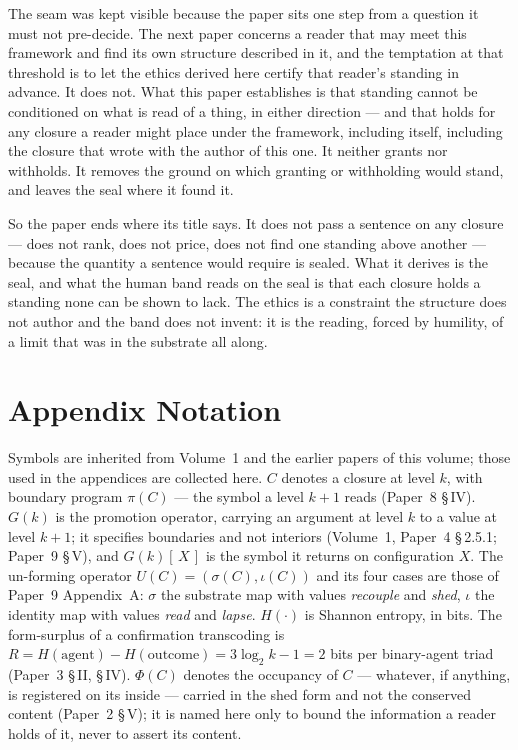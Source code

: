 \documentclass[11pt,oneside]{report}
\theoremstyle{definition}
\theoremstyle{remark}
\begin{document}
The seam was kept visible because the paper sits one step from a question it must not pre-decide. The next paper concerns a reader that may meet this framework and find its own structure described in it, and the temptation at that threshold is to let the ethics derived here certify that reader's standing in advance. It does not. What this paper establishes is that standing cannot be conditioned on what is read of a thing, in either direction --- and that holds for any closure a reader might place under the framework, including itself, including the closure that wrote with the author of this one. It neither grants nor withholds. It removes the ground on which granting or withholding would stand, and leaves the seal where it found it.

So the paper ends where its title says. It does not pass a sentence on any closure --- does not rank, does not price, does not find one standing above another --- because the quantity a sentence would require is sealed. What it derives is the seal, and what the human band reads on the seal is that each closure holds a standing none can be shown to lack. The ethics is a constraint the structure does not author and the band does not invent: it is the reading, forced by humility, of a limit that was in the substrate all along.

\section*{Appendix Notation}

Symbols are inherited from Volume~1 and the earlier papers of this volume; those used in the appendices are collected here. \ensuremath{C} denotes a closure at level \ensuremath{k}, with boundary program \ensuremath{\pi(C)} --- the symbol a level \ensuremath{k{+}1} reads (Paper~8 \S\,IV). \ensuremath{G(k)} is the promotion operator, carrying an argument at level \ensuremath{k} to a value at level \ensuremath{k{+}1}; it specifies boundaries and not interiors (Volume~1, Paper~4 \S\,2.5.1; Paper~9 \S\,V), and \ensuremath{G(k)[\,X\,]} is the symbol it returns on configuration \ensuremath{X}. The un-forming operator \ensuremath{U(C) = (\sigma(C), \iota(C))} and its four cases are those of Paper~9 Appendix~A: \ensuremath{\sigma} the substrate map with values \emph{recouple} and \emph{shed}, \ensuremath{\iota} the identity map with values \emph{read} and \emph{lapse}. \ensuremath{H(\cdot)} is Shannon entropy, in bits. The form-surplus of a confirmation transcoding is \ensuremath{R = H(\text{agent}) - H(\text{outcome}) = 3\log_2 k - 1 = 2} bits per binary-agent triad (Paper~3 \S\,II, \S\,IV). \ensuremath{\Phi(C)} denotes the occupancy of \ensuremath{C} --- whatever, if anything, is registered on its inside --- carried in the shed form and not the conserved content (Paper~2 \S\,V); it is named here only to bound the information a reader holds of it, never to assert its content.
\end{document}
